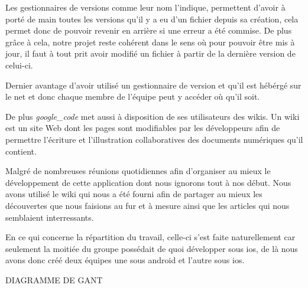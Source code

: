 		Les gestionnaires de versions comme leur nom l'indique, permettent d'avoir à
		porté de main toutes les versions qu'il y a eu d'un fichier depuis sa
		création, cela permet donc de pouvoir revenir en arrière si une erreur a été commise.
		De plus grâce à cela, notre projet reste cohérent dans le sens où pour pouvoir
		être mis à jour, il faut à tout prit avoir modifié un fichier à partir de la
		dernière version de celui-ci.
		
		Dernier avantage d'avoir utilisé un gestionnaire de version et qu'il est
		hébérgé sur le net et donc chaque membre de l'équipe peut y accéder où qu'il
		soit. 
		
		De plus \emph{\gls{google_code}} met aussi à disposition de ses utilisateurs des \glspl{wiki}.
		Un \gls{wiki} est un site Web dont les pages sont modifiables par les développeurs
		afin de permettre l'écriture et l'illustration collaboratives des documents numériques qu'il contient.
		
		Malgré de nombreuses réunions quotidiennes afin d'organiser au mieux le développement de cette application dont nous ignorons
		tout à nos début. Nous avons utilisé le \gls{wiki} qui nous a été fourni afin de partager au mieux
		les découvertes que nous faisions au fur et à mesure ainsi que les articles qui nous semblaient interressants.
		
		En ce qui concerne la répartition du travail, celle-ci s'est faite naturellement car
		seulement la moitiée du groupe possédait de quoi développer sous \gls{ios}, de là nous avons
		donc créé deux équipes une sous \gls{android} et l'autre sous \gls{ios}.
		
		
		DIAGRAMME DE GANT